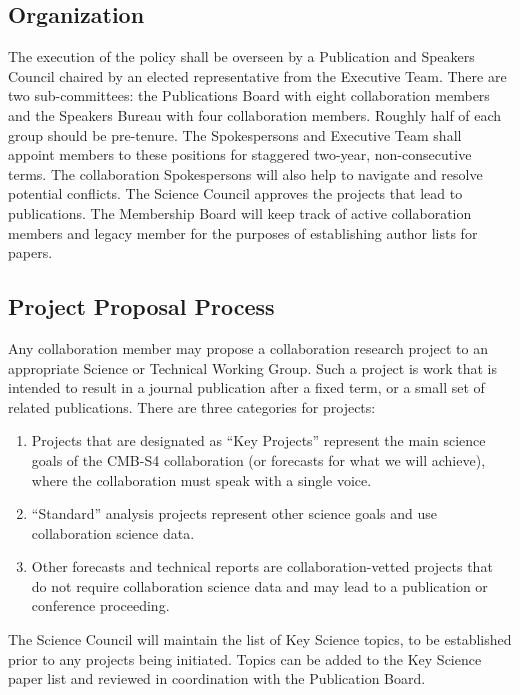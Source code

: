 \subsection{Organization}
The execution of the policy shall be overseen by a Publication and Speakers Council chaired by an elected representative from the Executive Team.  There are two sub-committees: the Publications Board with eight collaboration members and the Speakers Bureau with four collaboration members. Roughly half of each group should be pre-tenure. The Spokespersons and Executive Team shall appoint members to these positions for staggered two-year, non-consecutive terms. The collaboration Spokespersons will also help to navigate and resolve potential conflicts. The Science Council approves the projects that lead to publications. The Membership Board will keep track of active collaboration members and legacy member for the purposes of establishing author lists for papers.

\subsection{Project Proposal Process}


Any collaboration member may propose a collaboration research project to an appropriate Science or Technical Working Group.  Such a project is work that is intended to result in a journal publication after a fixed term, or a small set of related publications.  There are three categories for projects:
\begin{enumerate}
  \item Projects that are designated as ``Key Projects'' represent the main science goals of the CMB-S4 collaboration (or forecasts for what we will achieve), where the collaboration must speak with a single voice.  
\item ``Standard'' analysis projects represent other science goals and use collaboration science data.  
\item Other forecasts and technical reports are collaboration-vetted projects that do not require collaboration science data and may lead to a publication or conference proceeding.  
\end{enumerate}
The Science Council will maintain the list of Key Science topics, to be established prior to any projects being initiated.  Topics can be added to the Key Science paper list and reviewed in coordination with the Publication Board.


